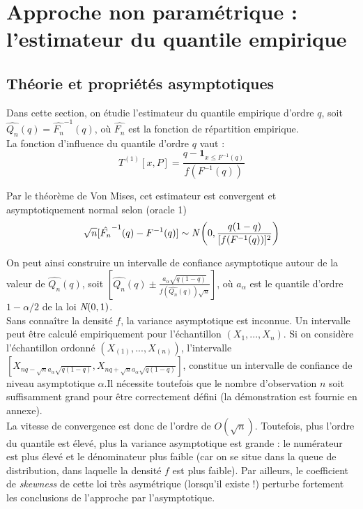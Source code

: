 \documentclass{article}
\renewcommand*{\(}{ \left( }
\renewcommand*{\)}{ \right) }
\begin{document}
\clearpage
\section{Approche non paramétrique : l'estimateur du quantile empirique}

\subsection{Théorie et propriétés asymptotiques}
Dans cette section, on étudie l'estimateur du quantile empirique d'ordre $q$, soit  $\hat{Q_n}(q)=\hat{F_n}^{-1}(q)$, où $\hat{F_n}$ est la fonction de répartition empirique.\\
La fonction d'influence du quantile d'ordre $q$ vaut \cite{Bertail}:
\[ \label{influenceQ} T^{(1)}[x,P] = \frac{q-\mathbf{1}_{x \leq F^{-1}(q)} }{ f(F^{-1}(q)) } \]

Par le théorème de Von Mises, cet estimateur est convergent et asymptotiquement normal selon (oracle 1) 
\[ \label{var1}
\sqrt{n}[\hat{F_n}^{-1}(q)-F^{-1}(q)]\sim \emph{N} \left( 0,\frac{q(1-q)}{[f(F^{-1}(q))]^2} \right)
\]

On peut ainsi construire un intervalle de confiance asymptotique autour de la valeur de $\hat{Q_n}(q)$, soit $[\hat{Q_n}(q) \pm \frac{a_{\alpha}\sqrt{q(1-q)}}{f(\hat{Q_n}(q))\sqrt{n}}]$, où $a_{\alpha}$ est le quantile d'ordre $1-\alpha/2$ de la loi $\emph{N}(0,1)$. \\

Sans connaître la densité $f$, la variance asymptotique est inconnue. Un intervalle peut être calculé empiriquement pour l'échantillon $(X_1, ..., X_n)$. Si on considère l'échantillon ordonné $(X_{(1)}, ..., X_{(n)})$, l'intervalle $[X_{nq-\sqrt{n}a_\alpha\sqrt{q(1-q)}},X_{nq+\sqrt{n}a_\alpha\sqrt{q(1-q)}}]$, constitue un intervalle de confiance de niveau asymptotique $\alpha$.Il nécessite toutefois que le nombre d'observation $n$ soit suffisamment grand pour être correctement défini (la démonstration est fournie en annexe).\\

La vitesse de convergence est donc de l'ordre de $O(\sqrt{n})$.
Toutefois, plus l'ordre du quantile est élevé, plus la variance asymptotique est grande : le numérateur est plus élevé et le dénominateur plus faible (car on se situe dans la queue de distribution, dans laquelle la densité $f$ est plus faible). Par ailleurs, le coefficient de \textit{skewness} de cette loi très asymétrique (lorsqu'il existe !) perturbe fortement les conclusions de l'approche par l'asymptotique.\\
\end{document}
